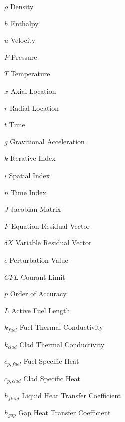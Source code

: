 \begin{eqlist}
\item[$\rho$] Density
\item[$h$] Enthalpy
\item[$u$] Velocity
\item[$P$] Pressure
\item[$T$] Temperature
\item[$x$] Axial Location
\item[$r$] Radial Location
\item[$t$] Time
\item[$g$] Gravitional Acceleration
\item[$k$] Iterative Index
\item[$i$] Spatial Index
\item[$n$] Time Index
\item[$J$] Jacobian Matrix
\item[$F$] Equation Residual Vector
\item[$\delta X$] Variable Residual Vector
\item[$\epsilon$] Perturbation Value
\item[$CFL$] Courant Limit
\item[$p$] Order of Accuracy
\item[$L$] Active Fuel Length
\item[$k_{fuel}$] Fuel Thermal Conductivity
\item[$k_{clad}$] Clad Thermal Conductivity
\item[$c_{p,fuel}$] Fuel Specific Heat
\item[$c_{p,clad}$] Clad Specific Heat
\item[$h_{fluid}$] Liquid Heat Transfer Coefficient
\item[$h_{gap}$] Gap Heat Transfer Coefficient
\end{eqlist}